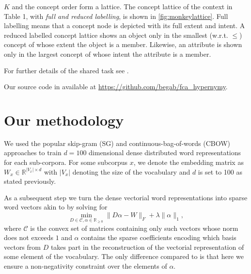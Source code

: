 \documentclass[11pt,a4paper]{article}
\begin{document}
$K$ and the concept order form a %
lattice.  The concept lattice of the context in Table 1, with \emph{full and reduced
labelling}, is shown in \ref{fig:monkeylattice}.
Full labelling means that a concept node is depicted with its full extent and
intent. A reduced labelled concept lattice shows an object only in the smallest
(w.r.t. $\le$) concept of whose extent the object is a member.
Likewise, an attribute is shown only in the largest concept of whose intent the
attribute is a member.%

For further details of the shared task see
\cite{semeval2018task9}.

Our source code in available at \url{https://github.com/begab/fca_hypernymy}.


\section{Our methodology}
We used the popular skip-gram (SG) and continuous-bag-of-words (CBOW) approaches \cite{DBLP:journals/corr/abs-1301-3781} to train $d=100$ dimensional dense distributed word representations for each sub-corpora. For some subcorpus $x$, we denote the embedding matrix as $W_x \in \mathbb{R}^{\lvert V_x \rvert \times d}$ with $\lvert V_x \rvert$ denoting the size of the vocabulary and $d$ is set to 100 as stated previously.

As a subsequent step we turn the dense vectorial word representations into sparse word vectors akin to \citet{TACL1063} by solving for
\begin{equation}
\min\limits_{D \in \mathcal{C}, \alpha \in \mathbb{R}_{\geq0}} \lVert D\alpha - W \rVert_F + \lambda \lVert \alpha \rVert_1,
\label{nonneg_SPAMS_objective}
\end{equation}
where $\mathcal{C}$ is the convex set of matrices containing only such vectors whose norm does not exceeds $1$ and $\alpha$ contains the sparse coefficients encoding which basis vectors from $D$ takes part in the reconstruction of the vectorial representation of some element of the vocabulary. The only difference compared to \cite{TACL1063} is that here we ensure a non-negativity constraint over the elements of $\alpha$.
\end{document}
